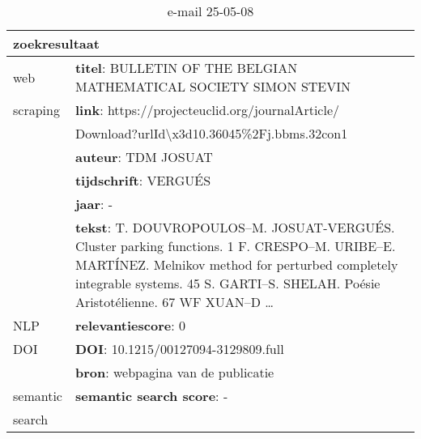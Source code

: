 \begin{table}[h!]
    \caption{e-mail 25-05-08}
    \centering
    \begin{tabularx}{\textwidth}{|p{4cm}|X|} 
        \hline
        \multicolumn{2}{|X|}{\textbf{zoekresultaat}} \\
        \hline
        web &\textbf{titel}: BULLETIN OF THE BELGIAN MATHEMATICAL SOCIETY SIMON STEVIN\\
        scraping&\textbf{link}: https://projecteuclid.org/journalArticle/\\&Download?urlId\textbackslash x3d10.36045\%2Fj.bbms.32con1\\
        &\textbf{auteur}: TDM JOSUAT\\
        &\textbf{tijdschrift}: VERGUÉS\\
        &\textbf{jaar}: -\\
        &\textbf{tekst}: T. DOUVROPOULOS–M. JOSUAT-VERGUÉS. Cluster parking functions. 1 F. CRESPO–M. URIBE–E. MARTÍNEZ. Melnikov method for perturbed completely integrable systems. 45 S. GARTI–S. SHELAH. Poésie Aristotélienne. 67 WF XUAN–D …\\
        \hline
        NLP&\textbf{relevantiescore}: 0\\
        \hline
        DOI&\textbf{DOI}: 10.1215/00127094-3129809.full\\
        &\textbf{bron}: webpagina van de publicatie\\
        \hline
        semantic&\textbf{semantic search score}: -\\
        search&\\
        \hline
    \end{tabularx}
    \label{table:email20250508}
\end{table}

